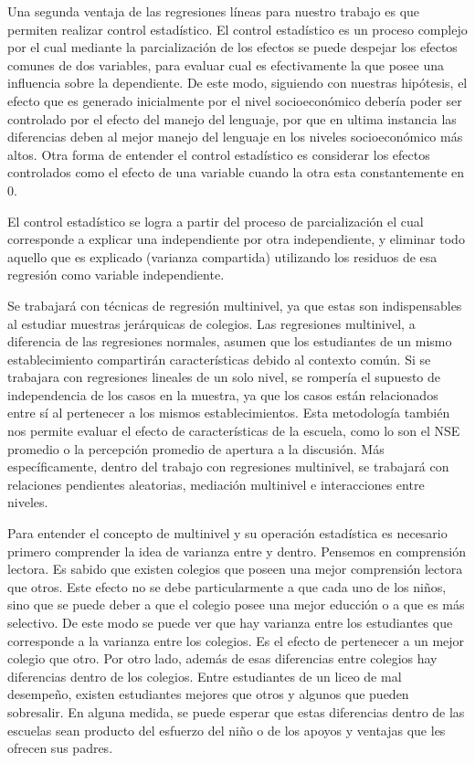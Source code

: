 \documentclass[12pt,twoside]{templates/facsothesis}
\begin{document}
Una segunda ventaja de las regresiones líneas para nuestro trabajo es que permiten realizar control estadístico. El control estadístico es un proceso complejo por el cual mediante la parcialización de los efectos se puede despejar los efectos comunes de dos variables, para evaluar cual es efectivamente la que posee una influencia sobre la dependiente. De este modo, siguiendo con nuestras hipótesis, el efecto que es generado inicialmente por el nivel socioeconómico debería poder ser controlado por el efecto del manejo del lenguaje, por que en ultima instancia las diferencias deben al mejor manejo del lenguaje en los niveles socioeconómico más altos. Otra forma de entender el control estadístico es considerar los efectos controlados como el efecto de una variable cuando la otra esta constantemente en 0.

El control estadístico se logra a partir del proceso de parcialización el cual corresponde a explicar una independiente por otra independiente, y eliminar todo aquello que es explicado (varianza compartida) utilizando los residuos de esa regresión como variable independiente.

Se trabajará con técnicas de regresión multinivel, ya que estas son indispensables al estudiar muestras jerárquicas de colegios. Las regresiones multinivel, a diferencia de las regresiones normales, asumen que los estudiantes de un mismo establecimiento compartirán características debido al contexto común. Si se trabajara con regresiones lineales de un solo nivel, se rompería el supuesto de independencia de los casos en la muestra, ya que los casos están relacionados entre sí al pertenecer a los mismos establecimientos. Esta metodología también nos permite evaluar el efecto de características de la escuela, como lo son el NSE promedio o la percepción promedio de apertura a la discusión. Más específicamente, dentro del trabajo con regresiones multinivel, se trabajará con relaciones pendientes aleatorias, mediación multinivel e interacciones entre niveles.

Para entender el concepto de multinivel y su operación estadística es necesario primero comprender la idea de varianza entre y dentro. Pensemos en comprensión lectora. Es sabido que existen colegios que poseen una mejor comprensión lectora que otros. Este efecto no se debe particularmente a que cada uno de los niños, sino que se puede deber a que el colegio posee una mejor educción o a que es más selectivo. De este modo se puede ver que hay varianza entre los estudiantes que corresponde a la varianza entre los colegios. Es el efecto de pertenecer a un mejor colegio que otro. Por otro lado, además de esas diferencias entre colegios hay diferencias dentro de los colegios. Entre estudiantes de un liceo de mal desempeño, existen estudiantes mejores que otros y algunos que pueden sobresalir. En alguna medida, se puede esperar que estas diferencias dentro de las escuelas sean producto del esfuerzo del niño o de los apoyos y ventajas que les ofrecen sus padres.
\end{document}
